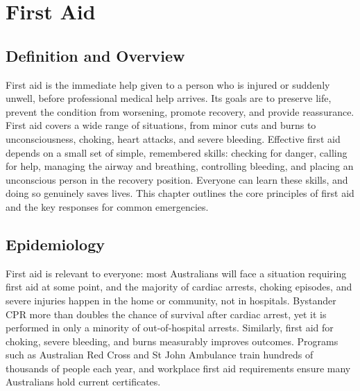 \chapter{First Aid}

\section*{Definition and Overview}
First aid is the immediate help given to a person who is injured or suddenly unwell, before professional medical help arrives. Its goals are to preserve life, prevent the condition from worsening, promote recovery, and provide reassurance. First aid covers a wide range of situations, from minor cuts and burns to unconsciousness, choking, heart attacks, and severe bleeding. Effective first aid depends on a small set of simple, remembered skills: checking for danger, calling for help, managing the airway and breathing, controlling bleeding, and placing an unconscious person in the recovery position. Everyone can learn these skills, and doing so genuinely saves lives. This chapter outlines the core principles of first aid and the key responses for common emergencies.

\section*{Epidemiology}
First aid is relevant to everyone: most Australians will face a situation requiring first aid at some point, and the majority of cardiac arrests, choking episodes, and severe injuries happen in the home or community, not in hospitals. Bystander CPR more than doubles the chance of survival after cardiac arrest, yet it is performed in only a minority of out-of-hospital arrests. Similarly, first aid for choking, severe bleeding, and burns measurably improves outcomes. Programs such as Australian Red Cross and St John Ambulance train hundreds of thousands of people each year, and workplace first aid requirements ensure many Australians hold current certificates.

